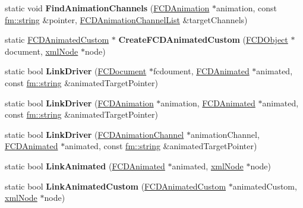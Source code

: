 \begin{DoxyCompactItemize}
\item 
\hypertarget{classFArchiveXML_a95051bf5aa5dde518da9f7ebc04b5218}{
static void {\bfseries FindAnimationChannels} (\hyperlink{classFCDAnimation}{FCDAnimation} $\ast$animation, const \hyperlink{classfm_1_1stringT}{fm::string} \&pointer, \hyperlink{classfm_1_1pvector}{FCDAnimationChannelList} \&targetChannels)}
\label{classFArchiveXML_a95051bf5aa5dde518da9f7ebc04b5218}

\item 
\hypertarget{classFArchiveXML_aae1c100720d9186e6fbb4cd9001addff}{
static \hyperlink{classFCDAnimatedCustom}{FCDAnimatedCustom} $\ast$ {\bfseries CreateFCDAnimatedCustom} (\hyperlink{classFCDObject}{FCDObject} $\ast$document, \hyperlink{struct__xmlNode}{xmlNode} $\ast$node)}
\label{classFArchiveXML_aae1c100720d9186e6fbb4cd9001addff}

\item 
\hypertarget{classFArchiveXML_afe88d7151c32efa5d9889e5b1ed30a7b}{
static bool {\bfseries LinkDriver} (\hyperlink{classFCDocument}{FCDocument} $\ast$fcdoument, \hyperlink{classFCDAnimated}{FCDAnimated} $\ast$animated, const \hyperlink{classfm_1_1stringT}{fm::string} \&animatedTargetPointer)}
\label{classFArchiveXML_afe88d7151c32efa5d9889e5b1ed30a7b}

\item 
\hypertarget{classFArchiveXML_a34091349172f576a2f02e3886dfc2595}{
static bool {\bfseries LinkDriver} (\hyperlink{classFCDAnimation}{FCDAnimation} $\ast$animation, \hyperlink{classFCDAnimated}{FCDAnimated} $\ast$animated, const \hyperlink{classfm_1_1stringT}{fm::string} \&animatedTargetPointer)}
\label{classFArchiveXML_a34091349172f576a2f02e3886dfc2595}

\item 
\hypertarget{classFArchiveXML_ad52e6057fd19967cd5209e8987068821}{
static bool {\bfseries LinkDriver} (\hyperlink{classFCDAnimationChannel}{FCDAnimationChannel} $\ast$animationChannel, \hyperlink{classFCDAnimated}{FCDAnimated} $\ast$animated, const \hyperlink{classfm_1_1stringT}{fm::string} \&animatedTargetPointer)}
\label{classFArchiveXML_ad52e6057fd19967cd5209e8987068821}

\item 
\hypertarget{classFArchiveXML_a0a7fe3e9e54cae1dd319d601410b40e1}{
static bool {\bfseries LinkAnimated} (\hyperlink{classFCDAnimated}{FCDAnimated} $\ast$animated, \hyperlink{struct__xmlNode}{xmlNode} $\ast$node)}
\label{classFArchiveXML_a0a7fe3e9e54cae1dd319d601410b40e1}

\item 
\hypertarget{classFArchiveXML_ae1b317ec797fa78504c1ec618dece108}{
static bool {\bfseries LinkAnimatedCustom} (\hyperlink{classFCDAnimatedCustom}{FCDAnimatedCustom} $\ast$animatedCustom, \hyperlink{struct__xmlNode}{xmlNode} $\ast$node)}
\label{classFArchiveXML_ae1b317ec797fa78504c1ec618dece108}


\end{DoxyCompactItemize}
